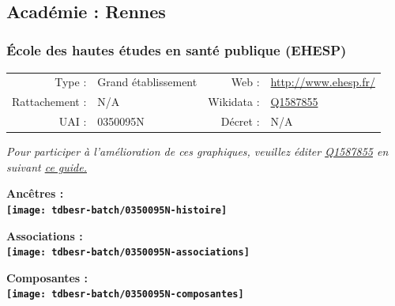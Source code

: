 \documentclass[12pt,french,]{article}
\begin{document}
\ifoddpage \fi ~\newpage  

\hypertarget{acaduxe9mie-rennes-1}{%
\subsection{Académie : Rennes}\label{acaduxe9mie-rennes-1}}

\hypertarget{uxe9cole-des-hautes-uxe9tudes-en-santuxe9-publique-ehesp}{%
\subsubsection{École des hautes études en santé publique
(EHESP)}\label{uxe9cole-des-hautes-uxe9tudes-en-santuxe9-publique-ehesp}}

\begin{tabular*}{\textwidth}{rp{5cm}rl}  
\hline  
Type : & Grand établissement & Web : &\href{http://www.ehesp.fr/}{http://www.ehesp.fr/} \\  
Rattachement : & N/A & Wikidata : & \href{https://www.wikidata.org/entity/Q1587855}{Q1587855} \\  
UAI : & 0350095N & Décret : & N/A \\  
\hline  
\end{tabular*}

\textit{\scriptsize Pour participer à l'amélioration de ces graphiques, veuillez éditer  \href{https://www.wikidata.org/entity/Q1587855}{Q1587855}  en suivant \href{https://github.com/cpesr/wikidataESR/blob/master/Rmd/wikidataESR.md}{ce guide.}}

\vspace{1cm}  
\begin{minipage}[b]{0.50\textwidth}\begin{center} \bf Ancêtres : \\  
\texttt{[image: tdbesr-batch/0350095N-histoire]} \end{center}\end{minipage}\begin{minipage}[b]{0.50\textwidth}\begin{center} \bf Associations : \\  
\texttt{[image: tdbesr-batch/0350095N-associations]} \end{center}\end{minipage}

\hrulefill

\begin{center} \bf Composantes : \\  
\texttt{[image: tdbesr-batch/0350095N-composantes]} \end{center}
\end{document}
